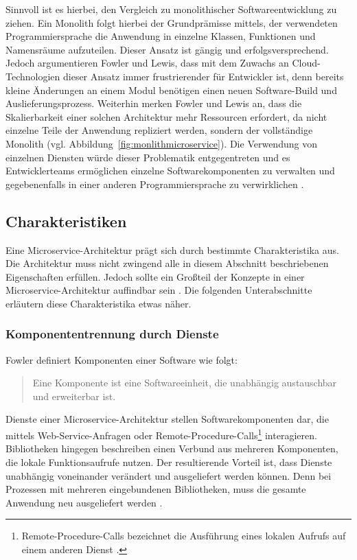Sinnvoll ist es hierbei, den Vergleich zu monolithischer Softwareentwicklung zu ziehen. 
Ein Monolith folgt hierbei der Grundprämisse mittels, der verwendeten Programmiersprache die Anwendung in einzelne Klassen, Funktionen und Namensräume aufzuteilen. 
Dieser Ansatz ist gängig und erfolgsversprechend. 
Jedoch argumentieren Fowler und Lewis, dass mit dem Zuwachs an Cloud-Technologien dieser Ansatz immer frustrierender für Entwickler ist, denn bereits kleine Änderungen an einem Modul benötigen einen neuen Software-Build und Auslieferungsprozess. 
Weiterhin merken Fowler und Lewis an, dass die Skalierbarkeit einer solchen Architektur mehr Ressourcen erfordert, da nicht einzelne Teile der Anwendung repliziert werden, sondern der vollständige Monolith (vgl. Abbildung~\ref{fig:monlithmicroservice}).
Die Verwendung von einzelnen Diensten würde dieser Problematik entgegentreten und es Entwicklerteams ermöglichen einzelne Softwarekomponenten zu verwalten und gegebenenfalls in einer anderen Programmiersprache zu verwirklichen \cite{FowlerMicroservice}.

\subsection{Charakteristiken}

Eine Microservice-Architektur prägt sich durch bestimmte Charakteristika aus. 
Die Architektur muss nicht zwingend alle in diesem Abschnitt beschriebenen Eigenschaften erfüllen. 
Jedoch sollte ein Großteil der Konzepte in einer Microservice-Architektur auffindbar sein \cite{FowlerMicroservice}. 
Die folgenden Unterabschnitte erläutern diese Charakteristika etwas näher.

\subsubsection{Komponententrennung durch Dienste}\label{TrennungdurchDienste}
Fowler definiert Komponenten einer Software wie folgt: \begin{quote}\glqq Eine Komponente ist eine Softwareeinheit, die unabhängig austauschbar und erweiterbar ist.\grqq{} \cite{FowlerSoftwareComponent} \end{quote}

Dienste einer Microservice-Architektur stellen Softwarekomponenten dar, die mittels Web-Service-Anfragen oder Remote-Procedure-Calls\footnote{Remote-Procedure-Calls bezeichnet die Ausführung eines lokalen Aufrufs auf einem anderen Dienst \cite{BuildingMicroservicesNewmanChapter5}.} interagieren.
Bibliotheken hingegen beschreiben einen Verbund aus mehreren Komponenten, die lokale Funktionsaufrufe nutzen. 
Der resultierende Vorteil ist, dass Dienste unabhängig voneinander verändert und ausgeliefert werden können. 
Denn bei Prozessen mit mehreren eingebundenen Bibliotheken, muss die gesamte Anwendung neu ausgeliefert werden \cite{FowlerMicroservice}. 

